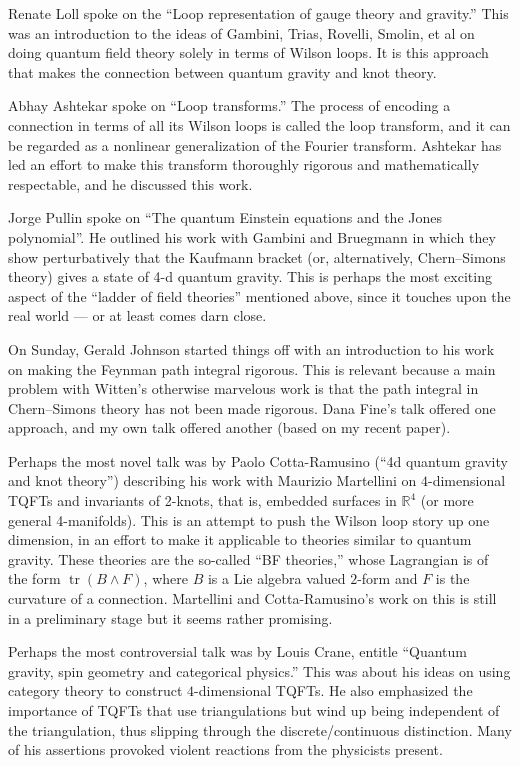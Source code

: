 \documentclass{article}
\begin{document}
Renate Loll spoke on the ``Loop representation of gauge theory and
gravity.'' This was an introduction to the ideas of Gambini, Trias,
Rovelli, Smolin, et al on doing quantum field theory solely in terms of
Wilson loops. It is this approach that makes the connection between
quantum gravity and knot theory.

Abhay Ashtekar spoke on ``Loop transforms.'' The process of encoding a
connection in terms of all its Wilson loops is called the loop
transform, and it can be regarded as a nonlinear generalization of the
Fourier transform. Ashtekar has led an effort to make this transform
thoroughly rigorous and mathematically respectable, and he discussed
this work.

Jorge Pullin spoke on ``The quantum Einstein equations and the Jones
polynomial''. He outlined his work with Gambini and Bruegmann in which
they show perturbatively that the Kaufmann bracket (or, alternatively,
Chern--Simons theory) gives a state of 4-d quantum gravity. This is
perhaps the most exciting aspect of the ``ladder of field theories''
mentioned above, since it touches upon the real world --- or at least
comes darn close.

On Sunday, Gerald Johnson started things off with an introduction to his
work on making the Feynman path integral rigorous. This is relevant
because a main problem with Witten's otherwise marvelous work is that
the path integral in Chern--Simons theory has not been made rigorous.
Dana Fine's talk offered one approach, and my own talk offered another
(based on my recent paper).

Perhaps the most novel talk was by Paolo Cotta-Ramusino (``4d quantum
gravity and knot theory'') describing his work with Maurizio Martellini
on \(4\)-dimensional TQFTs and invariants of 2-knots, that is, embedded
surfaces in \(\mathbb{R}^4\) (or more general 4-manifolds). This is an
attempt to push the Wilson loop story up one dimension, in an effort to
make it applicable to theories similar to quantum gravity. These
theories are the so-called ``BF theories,'' whose Lagrangian is of the
form \(\operatorname{tr}(B \wedge F)\), where \(B\) is a Lie algebra
valued \(2\)-form and \(F\) is the curvature of a connection. Martellini
and Cotta-Ramusino's work on this is still in a preliminary stage but it
seems rather promising.

Perhaps the most controversial talk was by Louis Crane, entitle
``Quantum gravity, spin geometry and categorical physics.'' This was
about his ideas on using category theory to construct \(4\)-dimensional
TQFTs. He also emphasized the importance of TQFTs that use
triangulations but wind up being independent of the triangulation, thus
slipping through the discrete/continuous distinction. Many of his
assertions provoked violent reactions from the physicists present.
\end{document}
